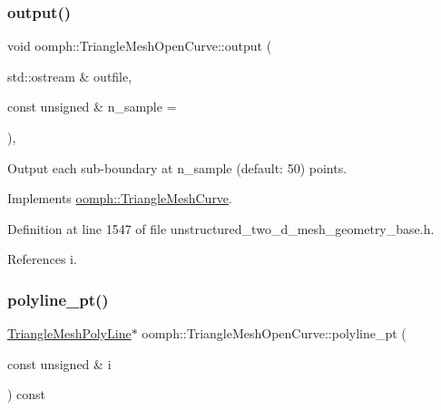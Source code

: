 \mbox{\label{classoomph_1_1TriangleMeshOpenCurve_adfffbe10445328b0b021b82443ff8458}} 
\subsubsection{\texorpdfstring{output()}{output()}}
{\footnotesize\ttfamily void oomph\+::\+Triangle\+Mesh\+Open\+Curve\+::output (\begin{DoxyParamCaption}\item[{std\+::ostream \&}]{outfile,  }\item[{const unsigned \&}]{n\+\_\+sample = {} }\end{DoxyParamCaption})\hspace{0.3cm}{\ttfamily [inline]}, {\ttfamily [virtual]}}



Output each sub-\/boundary at n\+\_\+sample (default\+: 50) points. 



Implements \hyperlink{classoomph_1_1TriangleMeshCurve_a7d40afc7e879fde0319b153a141915df}{oomph\+::\+Triangle\+Mesh\+Curve}.



Definition at line 1547 of file unstructured\+\_\+two\+\_\+d\+\_\+mesh\+\_\+geometry\+\_\+base.\+h.



References i.

\mbox{\label{classoomph_1_1TriangleMeshOpenCurve_ac9fa3405aa0b7d2aef03a12b7b1f3b40}} 
\subsubsection{\texorpdfstring{polyline\+\_\+pt()}{polyline\_pt()}\hspace{0.1cm}{\footnotesize\ttfamily [1/2]}}
{\footnotesize\ttfamily \hyperlink{classoomph_1_1TriangleMeshPolyLine}{Triangle\+Mesh\+Poly\+Line}$\ast$ oomph\+::\+Triangle\+Mesh\+Open\+Curve\+::polyline\+\_\+pt (\begin{DoxyParamCaption}\item[{const unsigned \&}]{i }\end{DoxyParamCaption}) const\hspace{0.3cm}{\ttfamily [inline]}}




